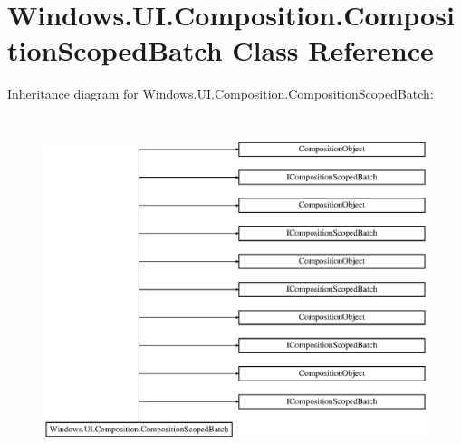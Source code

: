 \hypertarget{class_windows_1_1_u_i_1_1_composition_1_1_composition_scoped_batch}{}\section{Windows.\+U\+I.\+Composition.\+Composition\+Scoped\+Batch Class Reference}
\label{class_windows_1_1_u_i_1_1_composition_1_1_composition_scoped_batch}
Inheritance diagram for Windows.\+U\+I.\+Composition.\+Composition\+Scoped\+Batch\+:\begin{figure}[H]
\begin{center}
\leavevmode
\includegraphics[height=10.131579cm]{class_windows_1_1_u_i_1_1_composition_1_1_composition_scoped_batch}
\end{center}
\end{figure}
